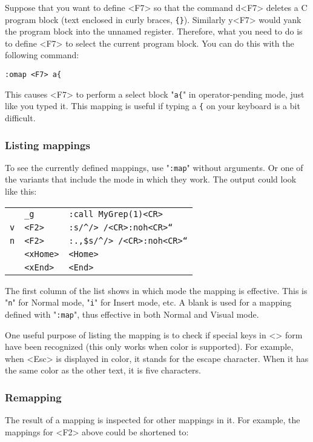 Suppose that you want to define <F7> so that the command d<F7> deletes a C program block (text enclosed in curly braces, \texttt{\{\}}).
Similarly y<F7> would yank the program block into the unnamed register.
Therefore, what you need to do is to define <F7> to select the current program block.
You can do this with the following command:

\begin{Verbatim}[samepage=true]
 :omap <F7> a{
\end{Verbatim}

This causes <F7> to perform a select block "\texttt{a\{}" in operator-pending mode, just like you typed it.
This mapping is useful if typing a \texttt{\{} on your keyboard is a bit difficult.
\subsubsection{Listing mappings}
To see the currently defined mappings, use "\texttt{:map}" without arguments.
Or one of the variants that include the mode in which they work.
The output could look like this:

\begin{center} \begin{tabular}{l l l}
				& \texttt{\_g} & \texttt{:call MyGrep(1)<CR>} \\
				\texttt{v} &  \texttt{<F2>} & \texttt{:s/\string^/> /<CR>:noh<CR>``} \\
				\texttt{n} &  \texttt{<F2>} & \texttt{:.,\$s/\string^/> /<CR>:noh<CR>``} \\
				& \texttt{<xHome>} & \texttt{<Home>} \\
				& \texttt{<xEnd>} & \texttt{<End>} \\
\end{tabular} \end{center}

The first column of the list shows in which mode the mapping is effective.
This is "\texttt{n}" for Normal mode, "\texttt{i}" for Insert mode, etc.
A blank is used for a mapping defined with "\texttt{:map}", thus effective in both Normal and Visual mode.

One useful purpose of listing the mapping is to check if special keys in <> form have been recognized (this only works when color is supported).
For example, when <Esc> is displayed in color, it stands for the escape character.
When it has the same color as the other text, it is five characters.

\subsubsection{Remapping}
The result of a mapping is inspected for other mappings in it.
For example, the mappings for <F2> above could be shortened to:

